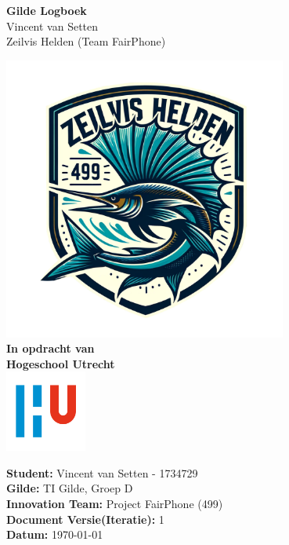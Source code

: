 \documentclass[a4paper]{report}
\newcommand{\latestVersion}{1}
\begin{document}
\begin{titlepage}
  \begin{center}
      \vspace*{.6cm}
      \Huge
      \textbf{ Gilde Logboek }\\
      \vspace{0.2cm}
      \small Vincent van Setten \\
      \small Zeilvis Helden (Team FairPhone)

      \normalsize


      \vspace{1cm}
      \includegraphics[width=0.7\textwidth]{Images/zeilvis_helden.png}
      \vspace{1cm}
      \Large\\
      \textbf{In opdracht van}\\
      \large
      \textbf{Hogeschool Utrecht} \\
      \includegraphics[width=0.2\textwidth]{Images/logouni.png}


      \vfill
    \end{center}
      \textbf{Student:} Vincent van Setten - 1734729 \\
      \textbf{Gilde:} TI Gilde, Groep D\\
      \textbf{Innovation Team:} Project FairPhone (499) \\
      \textbf{Document Versie(Iteratie):} \latestVersion \\
      \textbf{Datum:} \today \\
      \vspace{2cm}
\end{titlepage}
\end{document}
